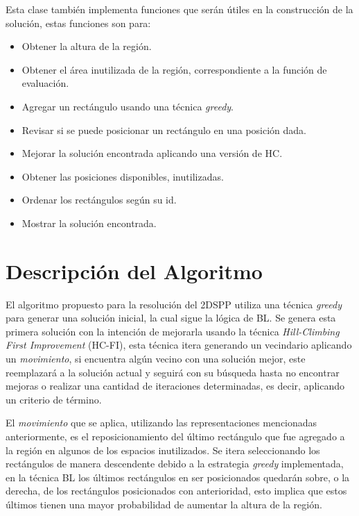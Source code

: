 \documentclass[letter, 10pt]{article}
\begin{document}
Esta clase tambi\'en implementa funciones que ser\'an \'utiles en la construcci\'on de la soluci\'on, estas funciones son para:
\begin{itemize}
    \item Obtener la altura de la regi\'on.
    \item Obtener el \'area inutilizada de la regi\'on, correspondiente a la funci\'on de evaluaci\'on.
    \item Agregar un rect\'angulo usando una t\'ecnica \emph{greedy}.
    \item Revisar si se puede posicionar un rect\'angulo en una posici\'on dada.
    \item Mejorar la soluci\'on encontrada aplicando una versi\'on de HC.
    \item Obtener las posiciones disponibles, inutilizadas.
    \item Ordenar los rect\'angulos seg\'un su id.
    \item Mostrar la soluci\'on encontrada.
\end{itemize}

\section{Descripci\'on del Algoritmo}

El algoritmo propuesto para la resoluci\'on del 2DSPP utiliza una t\'ecnica \emph{greedy} para generar una soluci\'on inicial, la cual sigue la l\'ogica de BL. Se genera esta primera soluci\'on con la intenci\'on de mejorarla usando la t\'ecnica \emph{Hill-Climbing First Improvement} (HC-FI), esta t\'ecnica itera generando un vecindario aplicando un \emph{movimiento}, si encuentra alg\'un vecino con una soluci\'on mejor, este reemplazar\'a a la soluci\'on actual y seguir\'a con su b\'usqueda hasta no encontrar mejoras o realizar una cantidad de iteraciones determinadas, es decir, aplicando un criterio de t\'ermino.

El \emph{movimiento} que se aplica, utilizando las representaciones mencionadas anteriormente, es el reposicionamiento del \'ultimo rect\'angulo que fue agregado a la regi\'on en algunos de los espacios inutilizados. Se itera seleccionando los rect\'angulos de manera descendente debido a la estrategia \emph{greedy} implementada, en la t\'ecnica BL los \'ultimos rect\'angulos en ser posicionados quedar\'an sobre, o la derecha, de los rect\'angulos posicionados con anterioridad, esto implica que estos \'ultimos tienen una mayor probabilidad de aumentar la altura de la regi\'on.
\end{document}
